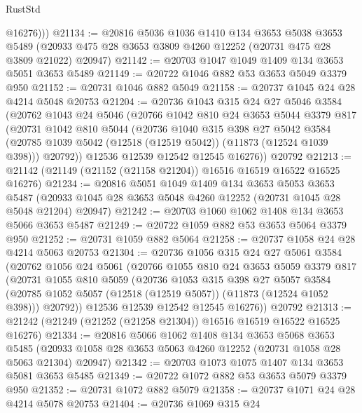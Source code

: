 \begin{lexlean}{RustStd}
\begin{coremodule}
          @16276)))
@21134 := @20816
    @5036
    @1036
    @1410
    @134
    @3653
    @5038
    @3653
    @5489
    (@20933 @475 @28 @3653 @3809 @4260 @12252 (@20731 @475 @28 @3809 @21022) @20947)
@21142 := @20703 @1047 @1049 @1409 @134 @3653 @5051 @3653 @5489
@21149 := @20722 @1046 @882 @53 @3653 @5049 @3379 @950
@21152 := @20731 @1046 @882 @5049
@21158 := @20737 @1045 @24 @28 @4214 @5048 @20753
@21204 := @20736
    @1043
    @315
    @24
    @27
    @5046
    @3584
    (@20762
      @1043
      @24
      @5046
      (@20766
        @1042
        @810
        @24
        @3653
        @5044
        @3379
        @817
        (@20731
          @1042
          @810
          @5044
          (@20736
            @1040
            @315
            @398
            @27
            @5042
            @3584
            (@20785 @1039 @5042 (@12518 (@12519 @5042)) (@11873 (@12524 @1039 @398)))
            @20792))
        @12536
        @12539
        @12542
        @12545
        @16276))
    @20792
@21213 := @21142 (@21149 (@21152 (@21158 @21204)) @16516 @16519 @16522 @16525 @16276)
@21234 := @20816
    @5051
    @1049
    @1409
    @134
    @3653
    @5053
    @3653
    @5487
    (@20933 @1045 @28 @3653 @5048 @4260 @12252 (@20731 @1045 @28 @5048 @21204) @20947)
@21242 := @20703 @1060 @1062 @1408 @134 @3653 @5066 @3653 @5487
@21249 := @20722 @1059 @882 @53 @3653 @5064 @3379 @950
@21252 := @20731 @1059 @882 @5064
@21258 := @20737 @1058 @24 @28 @4214 @5063 @20753
@21304 := @20736
    @1056
    @315
    @24
    @27
    @5061
    @3584
    (@20762
      @1056
      @24
      @5061
      (@20766
        @1055
        @810
        @24
        @3653
        @5059
        @3379
        @817
        (@20731
          @1055
          @810
          @5059
          (@20736
            @1053
            @315
            @398
            @27
            @5057
            @3584
            (@20785 @1052 @5057 (@12518 (@12519 @5057)) (@11873 (@12524 @1052 @398)))
            @20792))
        @12536
        @12539
        @12542
        @12545
        @16276))
    @20792
@21313 := @21242 (@21249 (@21252 (@21258 @21304)) @16516 @16519 @16522 @16525 @16276)
@21334 := @20816
    @5066
    @1062
    @1408
    @134
    @3653
    @5068
    @3653
    @5485
    (@20933 @1058 @28 @3653 @5063 @4260 @12252 (@20731 @1058 @28 @5063 @21304) @20947)
@21342 := @20703 @1073 @1075 @1407 @134 @3653 @5081 @3653 @5485
@21349 := @20722 @1072 @882 @53 @3653 @5079 @3379 @950
@21352 := @20731 @1072 @882 @5079
@21358 := @20737 @1071 @24 @28 @4214 @5078 @20753
@21404 := @20736
    @1069
    @315
    @24

\end{coremodule}
\end{lexlean}
